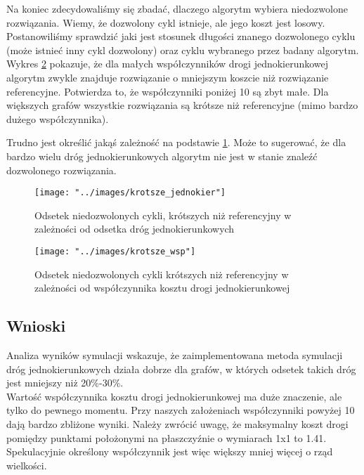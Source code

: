 \documentclass{article}
\begin{document}
Na koniec zdecydowaliśmy się zbadać, dlaczego algorytm wybiera niedozwolone rozwiązania. Wiemy, że dozwolony cykl istnieje, ale jego koszt jest losowy. Postanowiliśmy sprawdzić jaki jest stosunek długości znanego dozwolonego cyklu (może istnieć inny cykl dozwolony) oraz cyklu wybranego przez badany algorytm. \\

Wykres \ref{fig_krotsze_wsp} pokazuje, że dla małych współczynników drogi jednokierunkowej algorytm zwykle znajduje rozwiązanie o mniejszym koszcie niż rozwiązanie referencyjne. Potwierdza to, że współczynniki poniżej 10 są zbyt małe. Dla większych grafów wszystkie rozwiązania są krótsze niż referencyjne (mimo bardzo dużego współczynnika).

Trudno jest określić jakąś zależność na podstawie \ref{fig_krotsze_jednokier}. Może to sugerować, że dla bardzo wielu dróg jednokierunkowych algorytm nie jest w stanie znaleźć dozwolonego rozwiązania.


\begin{figure}
\texttt{[image: "../images/krotsze\_jednokier"]}
\caption{Odsetek niedozwolonych cykli, krótszych niż referencyjny w zależności od odsetka dróg jednokierunkowych}
\label{fig_krotsze_jednokier}
\end{figure}

\begin{figure}
\texttt{[image: "../images/krotsze\_wsp"]}
\caption{Odsetek niedozwolonych cykli krótszych niż referencyjny w zależności od współczynnika kosztu drogi jednokierunkowej}
\label{fig_krotsze_wsp}
\end{figure}

\subsection{Wnioski}
\label{ss_wnioski} 

Analiza wyników symulacji wskazuje, że zaimplementowana metoda symulacji dróg jednokierunkowych działa dobrze dla grafów, w których odsetek takich dróg jest mniejszy niż 20\%-30\%. \\

Wartość współczynnika kosztu drogi jednokierunkowej ma duże znaczenie, ale tylko do pewnego momentu. Przy naszych założeniach współczynniki powyżej 10 dają bardzo zbliżone wyniki. Należy zwrócić uwagę, że maksymalny koszt drogi pomiędzy punktami położonymi na płaszczyźnie o wymiarach 1x1 to 1.41. Spekulacyjnie określony współczynnik jest więc większy mniej więcej o rząd wielkości. \\
\end{document}
